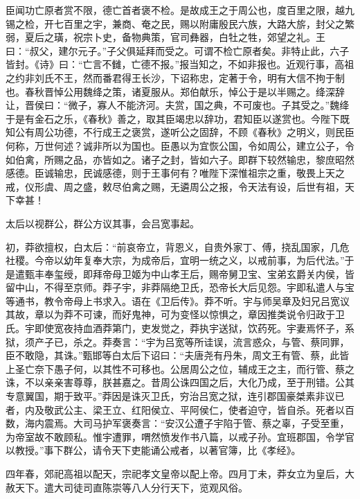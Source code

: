 \documentclass[]{article}
\begin{document}
臣闻功亡原者赏不限，德亡首者褒不检。是故成王之于周公也，度百里之限，越九锡之检，开七百里之宇，兼商、奄之民，赐以附庸殷民六族，大路大旂，封父之繁弱，夏后之璜，祝宗卜史，备物典策，官司彝器，白牡之牲，郊望之礼。王曰：``叔父，建尔元子。''子父俱延拜而受之。可谓不检亡原者矣。非特止此，六子皆封。《诗》曰：``亡言不雠，亡德不报。''报当知之，不如非报也。近观行事，高祖之约非刘氏不王，然而番君得王长沙，下诏称忠，定著于令，明有大信不拘于制也。春秋晋悼公用魏绛之策，诸夏服从。郑伯献乐，悼公于是以半赐之。绛深辞让，晋侯曰：``微子，寡人不能济河。夫赏，国之典，不可废也。子其受之。''魏绛于是有金石之乐，《春秋》善之，取其臣竭忠以辞功，君知臣以遂赏也。今陛下既知公有周公功德，不行成王之褒赏，遂听公之固辞，不顾《春秋》之明义，则民臣何称，万世何述？诚非所以为国也。臣愚以为宜恢公国，令如周公，建立公子，令如伯禽，所赐之品，亦皆如之。诸子之封，皆如六子。即群下较然输忠，黎庶昭然感德。臣诚输忠，民诚感德，则于王事何有？唯陛下深惟祖宗之重，敬畏上天之戒，仪形虞、周之盛，敕尽伯禽之赐，无遴周公之报，令天法有设，后世有祖，天下幸甚！

太后以视群公，群公方议其事，会吕宽事起。

初，莽欲擅权，白太后：``前哀帝立，背恩义，自贵外家丁、傅，挠乱国家，几危社稷。今帝以幼年复奉大宗，为成帝后，宜明一统之义，以戒前事，为后代法。''于是遣甄丰奉玺绶，即拜帝母卫姬为中山孝王后，赐帝舅卫宝、宝弟玄爵关内侯，皆留中山，不得至京师。莽子宇，非莽隔绝卫氏，恐帝长大后见怨。宇即私遣人与宝等通书，教令帝母上书求入。语在《卫后传》。莽不听。宇与师吴章及妇兄吕宽议其故，章以为莽不可谏，而好鬼神，可为变怪以惊惧之，章因推类说令归政于卫氏。宇即使宽夜持血酒莽第门，吏发觉之，莽执宇送狱，饮药死。宇妻焉怀子，系狱，须产子已，杀之。莽奏言：``宇为吕宽等所诖误，流言惑众，与管、蔡同罪，臣不敢隐，其诛。''甄邯等白太后下诏曰：``夫唐尧有丹朱，周文王有管、蔡，此皆上圣亡奈下愚子何，以其性不可移也。公居周公之位，辅成王之主，而行管、蔡之诛，不以亲亲害尊尊，朕甚嘉之。昔周公诛四国之后，大化乃成，至于刑错。公其专意翼国，期于致平。''莽因是诛灭卫氏，穷治吕宽之狱，连引郡国豪桀素非议已者，内及敬武公主、梁王立、红阳侯立、平阿侯仁，使者迫守，皆自杀。死者以百数，海内震焉。大司马护军褒奏言：``安汉公遭子宇陷于管、蔡之辜，子受至重，为帝室故不敢顾私。惟宇遭罪，喟然愤发作书八篇，以戒子孙。宜班郡国，令学官以教授。''事下群公，请令天下吏能诵公戒者，以著官簿，比《孝经》。

四年春，郊祀高祖以配天，宗祀孝文皇帝以配上帝。四月丁未，莽女立为皇后，大赦天下。遣大司徒司直陈崇等八人分行天下，览观风俗。
\end{document}
